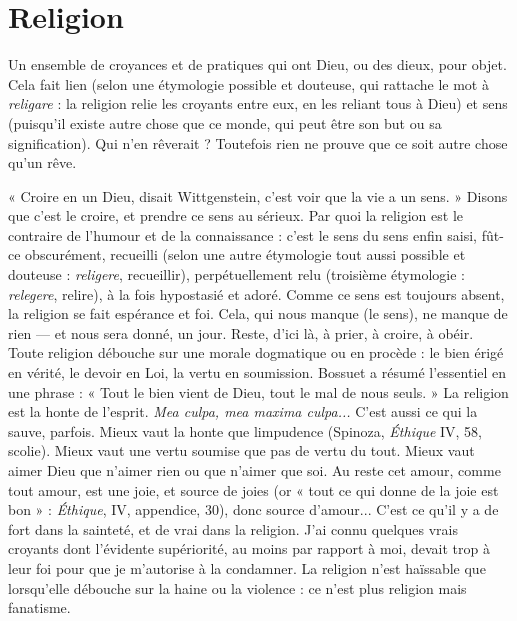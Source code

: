 \section{Religion}
Un ensemble de croyances et de pratiques qui ont Dieu, ou des
dieux, pour objet. Cela fait lien (selon une étymologie possible
et douteuse, qui rattache le mot à {\it religare} : la religion relie les croyants entre
eux, en les reliant tous à Dieu) et sens (puisqu'il existe autre chose que ce
monde, qui peut être son but ou sa signification). Qui n’en rêverait ? Toutefois
rien ne prouve que ce soit autre chose qu’un rêve.

« Croire en un Dieu, disait Wittgenstein, c’est voir que la vie a un sens. »
Disons que c’est le croire, et prendre ce sens au sérieux. Par quoi la religion est
le contraire de l'humour et de la connaissance : c’est le sens du sens enfin saisi,
fût-ce obscurément, recueilli (selon une autre étymologie tout aussi possible et
douteuse : {\it religere}, recueillir), perpétuellement relu (troisième étymologie :
{\it relegere}, relire), à la fois hypostasié et adoré. Comme ce sens est toujours absent,
la religion se fait espérance et foi. Cela, qui nous manque (le sens), ne manque
de rien — et nous sera donné, un jour. Reste, d’ici là, à prier, à croire, à obéir.
Toute religion débouche sur une morale dogmatique ou en procède : le bien
érigé en vérité, le devoir en Loi, la vertu en soumission. Bossuet a résumé
l'essentiel en une phrase : « Tout le bien vient de Dieu, tout le mal de nous
seuls. » La religion est la honte de l'esprit. {\it Mea culpa, mea maxima culpa...}
C’est aussi ce qui la sauve, parfois. Mieux vaut la honte que limpudence (Spinoza,
{\it Éthique} IV, 58, scolie). Mieux vaut une vertu soumise que pas de vertu
du tout. Mieux vaut aimer Dieu que n’aimer rien ou que n’aimer que soi. Au
reste cet amour, comme tout amour, est une joie, et source de joies (or « tout
ce qui donne de la joie est bon » : {\it Éthique}, IV, appendice, 30), donc source
d'amour... C’est ce qu’il y a de fort dans la sainteté, et de vrai dans la religion.
J'ai connu quelques vrais croyants dont l’évidente supériorité, au moins par
rapport à moi, devait trop à leur foi pour que je m’autorise à la condamner. La
religion n’est haïssable que lorsqu'elle débouche sur la haine ou la violence : ce
n'est plus religion mais fanatisme.

